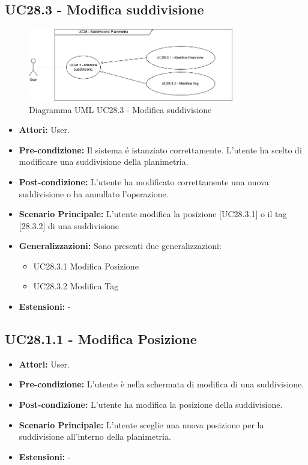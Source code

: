 \subsection{UC28.3 - Modifica suddivisione}
\begin{figure}[H]
  \centering
  \includegraphics[width=0.8\textwidth]{UC_diagrams_21-27/UC28.3.drawio.png}
  \caption{Diagramma UML UC28.3 - Modifica suddivisione}
\end{figure}
\begin{itemize}
    \item \textbf{Attori:} User.
    \item \textbf{Pre-condizione:}  Il sistema é istanziato correttamente. L'utente ha scelto di modificare una suddivisione della planimetria.
    \item \textbf{Post-condizione:} L'utente ha modificato correttamente una nuova suddivisione o ha annullato l'operazione.
    \item \textbf{Scenario Principale:} L'utente modifica la posizione [UC28.3.1] o il tag [28.3.2] di una suddivisione
    \item \textbf{Generalizzazioni:} Sono presenti due generalizzazioni:
    \begin{itemize}
        \item UC28.3.1 Modifica Posizione
        \item UC28.3.2 Modifica Tag
    \end{itemize}
    \item \textbf{Estensioni:} -
\end{itemize}

\subsection{UC28.1.1 - Modifica Posizione}
\begin{itemize}
    \item \textbf{Attori:} User.
    \item \textbf{Pre-condizione:}  L'utente è nella schermata di modifica di una  suddivisione.
    \item \textbf{Post-condizione:} L'utente ha modifica la posizione della suddivisione.
    \item \textbf{Scenario Principale:} L'utente sceglie una nuova posizione per la suddivisione all'interno della planimetria.
    \item \textbf{Estensioni:} -
\end{itemize}

